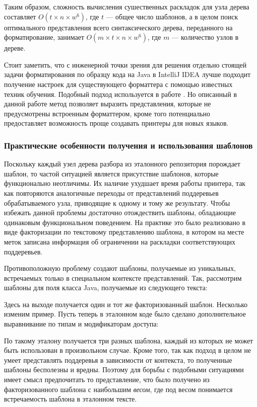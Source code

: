 Таким образом, сложность вычисления сушественных раскладок для узла дерева
составляет $O(t \times n \times w^{6})$, где $t$ --- общее число шаблонов,
а в целом поиск оптимального представления всего синтаксического дерева, переданного
на форматирование, занимает $O(m \times t \times n \times w^{6})$, где $m$
--- количество узлов в дереве.


Стоит заметить, что с инженерной точки зрения для решения отдельно стоящей задачи
форматирования по образцу кода на Java в IntelliJ IDEA лучше подходит
получение настроек для существующего форматтера с помощью известных техник обучения.
Подобный подход используется в работе \cite{learning}.
Но описанный в данной работе метод позволяет выразить представления, которые не
предусмотрены встроенным форматтером, кроме того потенциально предоставляет
возможность проще создавать принтеры для новых языков. 

\subsubsection{Практические особенности получения и использования шаблонов}

Поскольку каждый узел дерева разбора из эталонного репозитория порождает
шаблон, то частой ситуацией является присутствие шаблонов, которые функционально
неотличимы. Их наличие ухудшает время работы принтера, так как повторяются
аналогичные переходы от представлений поддеревьев обрабатываемого узла, приводящие
к одному и тому же результату. Чтобы избежать данной проблемы достаточно
отождествить шаблоны, обладающие одинаковым функциональном поведением.
На практике это было реализовано в виде факторизации по текстовому представлению
шаблона, в котором на месте меток записана информация об ограничении на раскладки
соответствующих поддеревьев.

Противоположную проблему создают шаблоны, получаемые из уникальных,
встречаемых только в специальном контексте представлений.
Так, рассмотрим шаблоны для поля класса Java,
получаемые из следующего текста:



Здесь на выходе получается один и тот же факторизованный шаблон.
Несколько изменим пример. Пусть теперь
в эталонном коде было сделано дополнительное выравнивание по типам
и модификаторам доступа:



По такому эталону получается три разных шаблона, каждый из которых не может
быть использован в произвольном случае. Кроме того, так как подход в целом не
умеет представлять поддеревья в зависимости от контекста, то полученные шаблоны
бесполезны и вредны. Поэтому для борьбы с подобными ситуациями имеет смысл
предпочитать то представление, что было получено из факторизованного шаблона с
наибольшим \emph{весом}, где под весом понимается встречаемость шаблона в
эталонном тексте.

